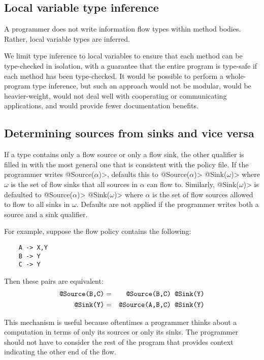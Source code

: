 \subsection{Local variable type inference}
\label{sec:type-inference}

A programmer does not write information flow types within method bodies.  Rather, local
variable types are inferred.

We limit type inference to local variables to ensure that
each method can be type-checked in isolation,
with a guarantee that the entire program is type-safe if each method has
been type-checked.  It would be possible to perform a whole-program type
inference, but such an approach would not be modular, would be
heavier-weight, would not deal well with cooperating or communicating
applications, and would provide fewer documentation benefits.  


\subsection{Determining sources from sinks and vice versa}
\label{sec:infer-from-flow-policy}

If a type contains only a flow source or only a flow sink, the other qualifier is
filled in with the most general one that is consistent
with the policy file.
%
If the programmer writes 
\<@Source($\alpha$)>, \theFlowChecker defaults this to
\<@Source($\alpha$)> \<@Sink($\omega$)> where $\omega$ is the
set of flow sinks that all sources in $\alpha$ can flow to.
%
Similarly,
\<@Sink($\omega$)> is defaulted to
\<@Source($\alpha$)> \<@Sink($\omega$)> where $\alpha$ is the
set of flow sources allowed to flow to all sinks in $\omega$.
%
Defaults are not applied if the programmer writes both a source and a
sink qualifier.

For example, suppose the flow policy contains the following:

\begin{Verbatim}
    A -> X,Y
    B -> Y
    C -> Y
\end{Verbatim}
  
\noindent 
Then these pairs are equivalent:
\begin{eqnarray*}
  \mbox{\<@Source({B,C})>} & = & \mbox{\<@Source({B,C}) @Sink(Y)>} \\
  \mbox{\<@Sink(Y)>}       & = & \mbox{\<@Source({A,B,C}) @Sink(Y)>}
\end{eqnarray*}

This mechanism is useful because oftentimes a programmer thinks about a
computation in terms of only its sources or only its sinks.
The programmer should not have to consider the rest of the program
that provides context indicating the other end of the flow.

